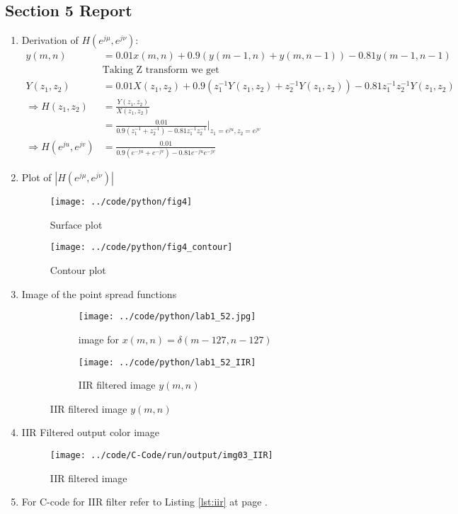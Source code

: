 \documentclass[a4paper,11pt]{article}
\newcommand{\reflst}[1]{Listing \ref{#1} at page \pageref{#1}}
\begin{document}
\subsection*{Section 5 Report}
\begin{enumerate}
\item Derivation of $H(e^{j\mu},e^{j\nu})$:
\begin{align*}
 y(m,n) &= 0.01x(m,n) + 0.9(y(m-1,n)+y(m,n-1)) -0.81y(m-1,n-1)\\
 &\text{Taking Z transform we get}\\
 Y(z_1,z_2)&= 0.01X(z_1,z_2) + 0.9(z_1^{-1}Y(z_1,z_2)+z_2^{-1}Y(z_1,z_2)) -0.81z_1^{-1}z_2^{-1}Y(z_1,z_2)\\
 \Rightarrow H(z_1,z_2) &= \frac{Y(z_1,z_2)}{X(z_1,z_2)}\\
 &= \frac{0.01}{0.9(z_1^{-1} + z_2^{-1}) -0.81z_1^{-1}z_2^{-1}}\Big|_{z_1=e^{ju},z_2=e^{jv}}\\
 \Rightarrow H(e^{ju},e^{jv}) &= \frac{0.01}{0.9(e^{-ju} + e^{-jv}) -0.81e^{-ju}e^{-jv}}
\end{align*}

\newpage
\item Plot of $|H(e^{j\mu},e^{j\nu})|$
\begin{figure}[!hp]
 \centering
 \texttt{[image: ../code/python/fig4]}
 \caption{Surface plot}
\end{figure}

\begin{figure}[!hp]
 \centering
 \texttt{[image: ../code/python/fig4\_contour]}
 \caption{Contour plot}
\end{figure}

\item Image of the point spread functions

\begin{figure}[!hp]
 \centering
 \begin{subfigure}[b]{0.45\textwidth}
  \centering
  \texttt{[image: ../code/python/lab1\_52.jpg]}
  \caption{image for $x(m,n)=\delta(m-127,n-127)$}
 \end{subfigure}
\hfill
\begin{subfigure}[b]{0.45\textwidth}
  \centering
  \texttt{[image: ../code/python/lab1\_52\_IIR]}
  \caption{IIR filtered image $y(m,n)$}
 \end{subfigure}
\end{figure}


\newpage
\item IIR Filtered output color image
\begin{figure}[!hp]
\centering
\texttt{[image: ../code/C-Code/run/output/img03\_IIR]}
\caption{IIR filtered image}
\end{figure}


\item For C-code for IIR filter refer to \reflst{lst:iir}.
\end{enumerate}
\end{document}
